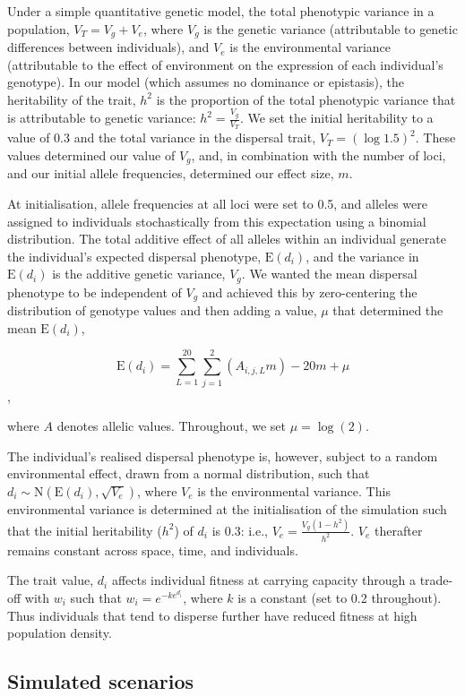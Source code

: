 \documentclass{article}
\begin{document}
Under a simple quantitative genetic model, the total phenotypic variance in a population, $V_T=V_g + V_e$, where $V_g$ is the genetic variance (attributable to genetic differences between individuals), and $V_e$ is the environmental variance (attributable to the effect of environment on the expression of each individual's genotype).  In our model (which assumes no dominance or epistasis), the heritability of the trait, $h^2$ is the proportion of the total phenotypic variance that is attributable to genetic variance: $h^2=\frac{V_g}{V_T}$.  We set the initial heritability to a value of 0.3 and the total variance in the dispersal trait, $V_T=(\log{1.5})^2$.  These values determined our value of $V_g$, and, in combination with the number of loci, and our initial allele frequencies, determined our effect size, $m$.

At initialisation, allele frequencies at all loci were set to 0.5, and alleles were assigned to individuals stochastically from this expectation using a binomial distribution. The
total additive effect of all alleles within an individual generate the
individual's expected dispersal phenotype, \(\text{E}(d_i)\), and the variance in \(\text{E}(d_i)\) is the additive genetic variance, $V_g$.  We wanted the mean dispersal phenotype to be independent of $V_g$ and achieved this by zero-centering the distribution of genotype values and then adding a value, $\mu$ that determined the mean \(\text{E}(d_i)\),

\[ \text{E}(d_i)=\sum_{L=1}^{20}\sum_{j=1}^{2}(A_{i,j,L}m)-20m+\mu\],

where $A$ denotes allelic values.  Throughout, we set $\mu=\log(2)$.

The individual's realised dispersal
phenotype is, however, subject to a random environmental effect, drawn from a normal distribution, such
that \(d_i\sim\text{N}(\text{E}(d_i), \sqrt{V_e})\), where \(V_e\) is
the environmental variance. This environmental variance is determined at
the initialisation of the simulation such that the initial heritability ($h^2$)
of \(d_i\) is 0.3: i.e., \(V_e=\frac{V_g(1-h^2)}{h^2}\). \(V_e\)
therafter remains constant across space, time, and individuals.

The trait value, \(d_i\) affects individual fitness at carrying capacity
through a trade-off with \(w_i\) such that \(w_i=e^{-ke^{d_i}}\), where $k$ is a constant (set to 0.2 throughout). Thus
individuals that tend to disperse further have reduced fitness at high
population density.

\subsection{Simulated scenarios}
\end{document}

